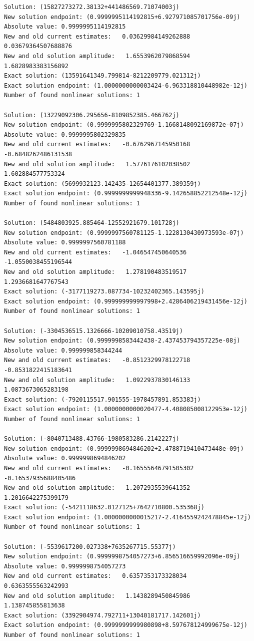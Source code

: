 \documentclass{article}
\begin{document}
\begin{verbatim}
Solution: (15827273272.38132+441486569.71074003j)
New solution endpoint: (0.9999995114192815+6.927971085701756e-09j) Absolute value: 0.9999995114192815
New and old current estimates:   0.03629984149262888    0.03679364507688876
New and old solution amplitude:   1.6553962079868594    1.6828983383156892
Exact solution: (13591641349.799814-8212209779.021312j)
Exact solution endpoint: (1.0000000000003424-6.963318810448982e-12j)
Number of found nonlinear solutions: 1

Solution: (13229092306.295656-8109852385.466762j)
New solution endpoint: (0.9999995802329769-1.1668148092169872e-07j) Absolute value: 0.9999995802329835
New and old current estimates:   -0.6762967145950168    -0.6848262486131538
New and old solution amplitude:   1.5776176102038502    1.602884577753324
Exact solution: (5699932123.142435-12654401377.389359j)
Exact solution endpoint: (0.9999999999948336-9.142658852212548e-12j)
Number of found nonlinear solutions: 1

Solution: (5484803925.885464-12552921679.101728j)
New solution endpoint: (0.9999997560781125-1.1228130430973593e-07j) Absolute value: 0.9999997560781188
New and old current estimates:   -1.046547450640536    -1.0550038455196544
New and old solution amplitude:   1.278190483519517    1.2936681647767543
Exact solution: (-3177119273.087734-10232402365.143595j)
Exact solution endpoint: (0.999999999997998+2.4286406219431456e-12j)
Number of found nonlinear solutions: 1

Solution: (-3304536515.1326666-10209010758.43519j)
New solution endpoint: (0.9999998583442438-2.437453794357225e-08j) Absolute value: 0.999999858344244
New and old current estimates:   -0.8512329978122718    -0.8531822415183641
New and old solution amplitude:   1.0922937830146133    1.0873673065283198
Exact solution: (-7920115517.901555-1978457891.853383j)
Exact solution endpoint: (1.0000000000020477-4.408085008122953e-12j)
Number of found nonlinear solutions: 1

Solution: (-8040713488.43766-1980583286.2142227j)
New solution endpoint: (0.9999998694846202+2.4788719410473448e-09j) Absolute value: 0.9999998694846202
New and old current estimates:   -0.16555646791505302    -0.16537935688405486
New and old solution amplitude:   1.2072935539641352    1.2016642275399179
Exact solution: (-5421118632.0127125+7642710800.535368j)
Exact solution endpoint: (1.0000000000015217-2.4164559242478845e-12j)
Number of found nonlinear solutions: 1

Solution: (-5539617200.027338+7635267715.55377j)
New solution endpoint: (0.9999998754057273+6.856516659992096e-09j) Absolute value: 0.9999998754057273
New and old current estimates:   0.6357353173328034    0.6363555563242993
New and old solution amplitude:   1.1438289450845986    1.138745855813638
Exact solution: (3392904974.792711+13040181717.142601j)
Exact solution endpoint: (0.9999999999980898+8.597678124999675e-12j)
Number of found nonlinear solutions: 1


\end{verbatim}
\end{document}
